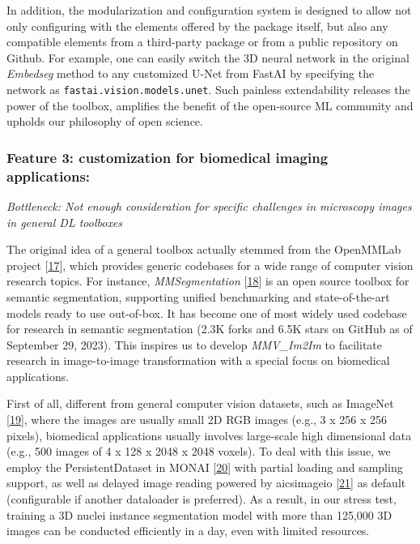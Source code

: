 In addition, the modularization and configuration system is designed to allow not only configuring with the elements offered by the package itself, but also any compatible elements from a third-party package or from a public repository on Github. For example, one can easily switch the 3D neural network in the original \emph{Embedseg} method to any customized U-Net from FastAI by specifying the network as \texttt{fastai.vision.models.unet}. Such painless extendability releases the power of the toolbox, amplifies the benefit of the open-source ML community and upholds our philosophy of open science.

\hypertarget{feature-3-customization-for-biomedical-imaging-applications}{%
\subsubsection{Feature 3: customization for biomedical imaging applications:}\label{feature-3-customization-for-biomedical-imaging-applications}}

\emph{Bottleneck: Not enough consideration for specific challenges in microscopy images in general DL toolboxes}

The original idea of a general toolbox actually stemmed from the OpenMMLab project {[}\protect\hyperlink{ref-W2Aka9D9}{17}{]}, which provides generic codebases for a wide range of computer vision research topics. For instance, \emph{MMSegmentation} {[}\protect\hyperlink{ref-EcizztLg}{18}{]} is an open source toolbox for semantic segmentation, supporting unified benchmarking and state-of-the-art models ready to use out-of-box. It has become one of most widely used codebase for research in semantic segmentation (2.3K forks and 6.5K stars on GitHub as of September 29, 2023). This inspires us to develop \emph{MMV\_Im2Im} to facilitate research in image-to-image transformation with a special focus on biomedical applications.

First of all, different from general computer vision datasets, such as ImageNet {[}\protect\hyperlink{ref-lt4BNUoG}{19}{]}, where the images are usually small 2D RGB images (e.g., 3 x 256 x 256 pixels), biomedical applications usually involves large-scale high dimensional data (e.g., 500 images of 4 x 128 x 2048 x 2048 voxels). To deal with this issue, we employ the PersistentDataset in MONAI {[}\protect\hyperlink{ref-UU62HYC6}{20}{]} with partial loading and sampling support, as well as delayed image reading powered by aicsimageio {[}\protect\hyperlink{ref-gsfWGJKf}{21}{]} as default (configurable if another dataloader is preferred). As a result, in our stress test, training a 3D nuclei instance segmentation model with more than 125,000 3D images can be conducted efficiently in a day, even with limited resources.


